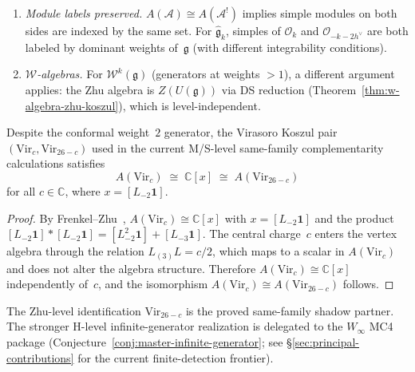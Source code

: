 \begin{remark}\label{rem:zhu-koszul-scope}
\leavevmode
\begin{enumerate}[label=(\roman*)]
\item \emph{Module labels preserved.}  $A(\mathcal{A}) \cong A(\mathcal{A}^!)$ implies simple modules on both sides are indexed by the same set.  For $\widehat{\mathfrak{g}}_k$, simples of $\mathcal{O}_k$ and $\mathcal{O}_{-k-2h^\vee}$ are both labeled by dominant weights of~$\mathfrak{g}$ (with different integrability conditions).
\item \emph{$\mathcal{W}$-algebras.}  For $\mathcal{W}^k(\mathfrak{g})$ (generators at weights $> 1$), a different argument applies: the Zhu algebra is $Z(U(\mathfrak{g}))$ via DS reduction (Theorem~\ref{thm:w-algebra-zhu-koszul}), which is level-independent.
\end{enumerate}
\end{remark}

\begin{corollary}
\label{cor:virasoro-zhu-koszul}
Despite the conformal weight~$2$ generator, the Virasoro Koszul pair
$(\mathrm{Vir}_c, \mathrm{Vir}_{26-c})$ used in the current M/S-level
same-family complementarity calculations satisfies
\[
A(\mathrm{Vir}_c) \;\cong\; \mathbb{C}[x]
\;\cong\; A(\mathrm{Vir}_{26-c})
\]
for all $c \in \mathbb{C}$, where $x = [L_{-2}\mathbf{1}]$.
\end{corollary}

\begin{proof}
By Frenkel--Zhu~\cite{FZ92},
$A(\mathrm{Vir}_c) \cong \mathbb{C}[x]$ with
$x = [L_{-2}\mathbf{1}]$ and the product
$[L_{-2}\mathbf{1}] * [L_{-2}\mathbf{1}]
= [L_{-2}^2\mathbf{1}] + [L_{-3}\mathbf{1}]$.
The central charge~$c$ enters the vertex algebra through the
relation $L_{(3)}L = c/2$, which maps to a scalar in
$A(\mathrm{Vir}_c)$ and does not alter the algebra structure.
Therefore $A(\mathrm{Vir}_c) \cong \mathbb{C}[x]$
independently of~$c$, and the isomorphism
$A(\mathrm{Vir}_c) \cong A(\mathrm{Vir}_{26-c})$ follows.
\end{proof}

\begin{remark}\label{rem:virasoro-mc4-scope}
The Zhu-level identification $\mathrm{Vir}_{26-c}$ is the proved same-family shadow partner.
The stronger H-level infinite-generator realization is delegated to the
$W_\infty$ MC4 package
(Conjecture~\ref{conj:master-infinite-generator};
see \S\ref{sec:principal-contributions} for the current finite-detection frontier).
\end{remark}

